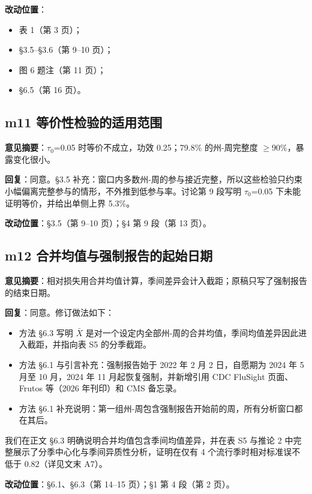 \documentclass[UTF8,a4paper,11pt,fontset=none]{ctexart}
\providecommand{\tightlist}{\setlength{\itemsep}{1pt}\setlength{\parskip}{0pt}}
\begin{document}
\textbf{改动位置}：

\begin{itemize}
\tightlist
\item
  表 1（第 3 页）；
\item
  §3.5--§3.6（第 9--10 页）；
\item
  图 6 题注（第 11 页）；
\item
  §6.5（第 16 页）。
\end{itemize}

\subsection*{m11 等价性检验的适用范围}

\textbf{意见摘要}：\(\tau_0\)=0.05 时等价不成立，功效 0.25；79.8\% 的州-周完整度 \(\geq 90\%\)，暴露变化很小。

\textbf{回复}：同意。§3.5 补充：窗口内多数州-周的参与接近完整，所以这些检验只约束小幅偏离完整参与的情形，不外推到低参与率。讨论第 9 段写明 \(\tau_0\)=0.05 下未能证明等价，并给出单侧上界 5.3\%。

\textbf{改动位置}：§3.5（第 9--10 页）；§4 第 9 段（第 13 页）。

\subsection*{m12 合并均值与强制报告的起始日期}

\textbf{意见摘要}：相对损失用合并均值计算，季间差异会计入截距；原稿只写了强制报告的结束日期。

\textbf{回复}：同意。修订做法如下：

\begin{itemize}
\tightlist
\item
  方法 §6.3 写明 \(\bar X\) 是对一个设定内全部州-周的合并均值，季间均值差异因此进入截距，并指向表 S5 的分季截距。
\item
  方法 §6.1 与引言补充：强制报告始于 2022 年 2 月 2 日，自愿期为 2024 年 5 月至 10 月，2024 年 11 月起恢复强制，并新增引用 CDC FluSight 页面、Frutos 等（2026 年刊印）和 CMS 备忘录。
\item
  方法 §6.1 补充说明：第一组州-周包含强制报告开始前的周，所有分析窗口都在其后。
\end{itemize}

我们在正文 §6.3 明确说明合并均值包含季间均值差异，并在表 S5 与推论 2 中完整展示了分季中心化与季间异质性分析，证明在仅有 4 个流行季时相对标准误不低于 0.82（详见文末 A7）。

\textbf{改动位置}：§6.1、§6.3（第 14--15 页）；§1 第 4 段（第 2 页）。
\end{document}
